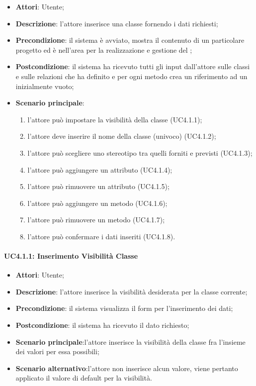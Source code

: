 \begin{itemize}
\item \textbf{Attori}: Utente;
\item \textbf{Descrizione}: l'attore inserisce una classe fornendo i dati richiesti;
\item \textbf{Precondizione}: il sistema è avviato, mostra il contenuto di un particolare progetto ed è nell'area per la realizzazione e gestione del ;
\item \textbf{Postcondizione}: il sistema ha ricevuto tutti gli input dall'attore sulle classi e sulle relazioni che ha definito e per ogni metodo crea un riferimento ad un  inizialmente vuoto;
\item \textbf{Scenario principale}:
	\begin{enumerate}
		\item l'attore può impostare la visibilità della classe (UC4.1.1);
		\item l'attore deve inserire il nome della classe (univoco) (UC4.1.2);
		\item l'attore può scegliere uno stereotipo tra quelli forniti e previsti (UC4.1.3);
		\item l'attore può aggiungere un attributo (UC4.1.4);
		\item l'attore può rimuovere un attributo (UC4.1.5);
		\item l'attore può aggiungere un metodo (UC4.1.6);
		\item l'attore può rimuovere un metodo (UC4.1.7);

		\item l'attore può confermare i dati inseriti (UC4.1.8).
	\end{enumerate}
\end{itemize}

\paragraph{UC4.1.1: Inserimento Visibilità Classe}
\label{UC4.1.1}

\begin{itemize}
\item \textbf{Attori}: Utente;
\item \textbf{Descrizione}: l'attore inserisce la visibilità desiderata per la classe corrente;
\item \textbf{Precondizione}: il sistema visualizza il form per l'inserimento dei dati;
\item \textbf{Postcondizione}: il sistema ha ricevuto il dato richiesto;
\item \textbf{Scenario principale}:l'attore inserisce la visibilità della classe fra l'insieme dei valori per essa possibili;
\item \textbf{Scenario alternativo}:l'attore non inserisce alcun valore, viene pertanto applicato il valore di default per la visibilità.
\end{itemize}

